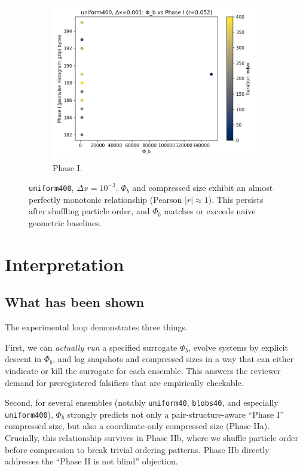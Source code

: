 \documentclass[11pt,a4paper]{article}
\numberwithin{equation}{section}
\newcommand{\phib}{\Phi_b}
\begin{document}
\begin{figure}[h!]
\begin{subfigure}[b]{0.32\textwidth}
\includegraphics[width=\textwidth]{figures/uniform400_dx0.001_phib_vs_phase1.png}
\caption{Phase I.}
\end{subfigure}
\caption{\texttt{uniform400}, $\Delta x{=}10^{-3}$. $\phib$ and compressed size exhibit an almost perfectly monotonic relationship (Pearson $|r|\approx 1$). This persists after shuffling particle order, and $\phib$ matches or exceeds naive geometric baselines.}
\label{fig:uniform400_corr}
\end{figure}

\clearpage

\section{Interpretation}
\subsection{What has been shown}
The experimental loop demonstrates three things.

First, we can \emph{actually run} a specified surrogate $\phib$, evolve systems by explicit descent in $\phib$, and log snapshots and compressed sizes in a way that can either vindicate or kill the surrogate for each ensemble. This answers the reviewer demand for preregistered falsifiers that are empirically checkable.

Second, for several ensembles (notably \texttt{uniform40}, \texttt{blobs40}, and especially \texttt{uniform400}), $\phib$ strongly predicts not only a pair-structure-aware ``Phase I'' compressed size, but also a coordinate-only compressed size (Phase IIa). Crucially, this relationship survives in Phase IIb, where we shuffle particle order before compression to break trivial ordering patterns. Phase IIb directly addresses the ``Phase II is not blind'' objection.
\end{document}
